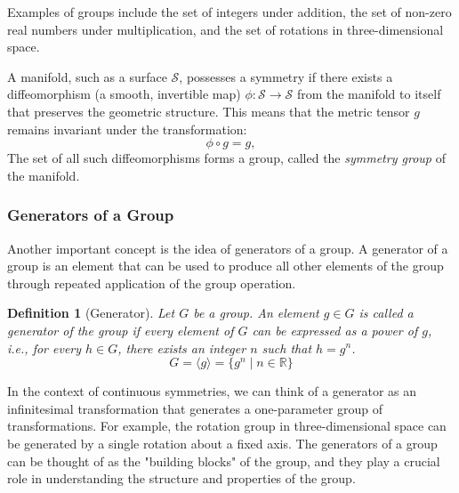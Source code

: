 \documentclass[12pt]{article}
\newcommand{\R}{\mathbb{R}}
\newtheorem{definition}{Definition}[section]
\begin{document}
Examples of groups include the set of integers under addition, the set of non-zero real numbers under multiplication, and the set of rotations in three-dimensional space.


A manifold, such as a surface $\mathcal{S}$, possesses a symmetry if there exists a diffeomorphism (a smooth, invertible map) $\phi: \mathcal{S} \to \mathcal{S}$ from the manifold to itself that preserves the geometric structure.
This means that the metric tensor $g$ remains invariant under the transformation:
\[
	\phi \circ g = g,
\]
The set of all such diffeomorphisms forms a group, called the \emph{symmetry group} of the manifold.


\subsubsection{Generators of a Group}
Another important concept is the idea of generators of a group.
A generator of a group is an element that can be used to produce all other elements of the group through repeated application of the group operation.

\begin{definition}[Generator]
	Let $G$ be a group. An element $g \in G$ is called a \emph{generator} of the group if every element of $G$ can be expressed as a power of $g$, i.e., for every $h \in G$, there exists an integer $n$ such that $h = g^n$.
	\[
		G = \langle g \rangle = \{ g^n \mid n \in \R \}
	\]
\end{definition}


In the context of continuous symmetries, we can think of a generator as an infinitesimal transformation that generates a one-parameter group of transformations.
For example, the rotation group in three-dimensional space can be generated by a single rotation about a fixed axis.
The generators of a group can be thought of as the "building blocks" of the group, and they play a crucial role in understanding the structure and properties of the group.
\end{document}
